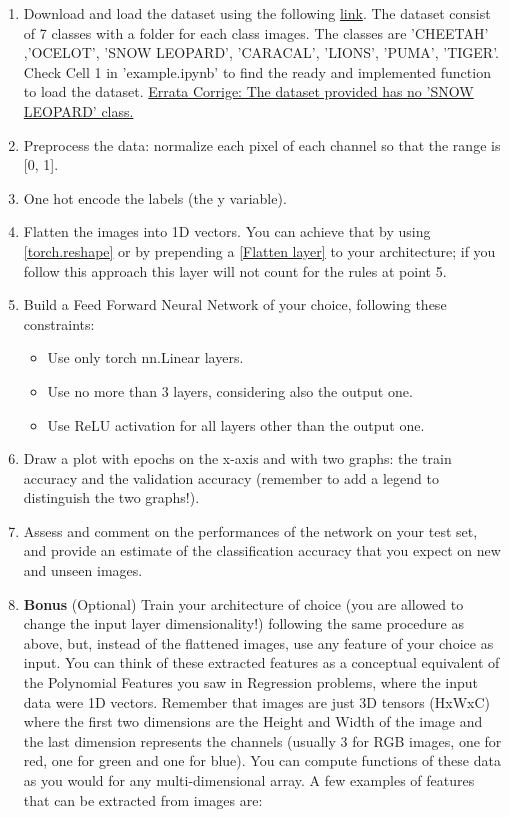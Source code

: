 \documentclass[11pt]{scrartcl}
\begin{document}
\begin{enumerate}
\item Download and load the dataset using the following 
\href{https://drive.switch.ch/index.php/s/XSnhQDNar7y46oQ}{link}.  
The dataset consist of 7 classes with a folder for each class images. 
The classes are 'CHEETAH' ,'OCELOT', 'SNOW LEOPARD', 'CARACAL', 'LIONS', 'PUMA', 'TIGER'. 
Check Cell 1 in 'example.ipynb' to find the ready and implemented function to load the dataset. 
\underline{Errata Corrige: The dataset provided has no 'SNOW LEOPARD' class.}

\item Preprocess the data: normalize each pixel of each channel so that the range is [0, 1].

\item One hot encode the labels (the y variable).

\item Flatten the images into 1D vectors. 
You can achieve that by using 
\href{https://pytorch.org/docs/stable/generated/torch.reshape.html}{[torch.reshape]} 
or by prepending a 
\href{https://pytorch.org/docs/stable/generated/torch.nn.Flatten.html}{[Flatten layer]} 
to your architecture; 
if you follow this approach this layer will not count for the rules at point 5.

\item Build a Feed Forward Neural Network of your choice, following these constraints:
\begin{itemize}
	\item Use only torch nn.Linear layers.
	\item Use no more than 3 layers, considering also the output one.
	\item Use ReLU activation for all layers other than the output one.
\end{itemize}

\item Draw a plot with epochs on the x-axis and with two graphs: 
the train accuracy and the validation accuracy 
(remember to add a legend to distinguish the two graphs!).

\item Assess and comment on the performances of the network on your test set, 
and provide an estimate of the classification accuracy that you expect on new and unseen images. 
\item \textbf{Bonus} (Optional) 
Train your architecture of choice 
(you are allowed to change the input layer dimensionality!) 
following the same procedure as above, but, instead of the flattened images, 
use any feature of your choice as input. 
You can think of these extracted features as a conceptual equivalent of the Polynomial Features 
you saw in Regression problems, where the input data were 1D vectors. 
Remember that images are just 3D tensors (HxWxC) 
where the first two dimensions are the Height and Width of the image 
and the last dimension represents the channels 
(usually 3 for RGB images, one for red, one for green and one for blue). 
You can compute functions of these data as you would for any multi-dimensional array. 
A few examples of features that can be extracted from images are:


\end{enumerate}
\end{document}
